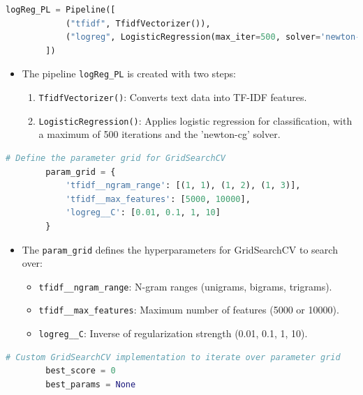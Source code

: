 \documentclass{solutionclass} %
\begin{document}
\begin{solution}
	\begin{lstlisting}[language=Python]
        logReg_PL = Pipeline([
            ("tfidf", TfidfVectorizer()),
            ("logreg", LogisticRegression(max_iter=500, solver='newton-cg'))
        ])
        \end{lstlisting}
        
        \begin{itemize}
            \item The pipeline \texttt{logReg\_PL} is created with two steps:
            \begin{enumerate}
                \item \texttt{TfidfVectorizer()}: Converts text data into TF-IDF features.
                \item \texttt{LogisticRegression()}: Applies logistic regression for classification, with a maximum of 500 iterations and the 'newton-cg' solver.
            \end{enumerate}
        \end{itemize}
        
        \begin{lstlisting}[language=Python]
        # Define the parameter grid for GridSearchCV
        param_grid = {
            'tfidf__ngram_range': [(1, 1), (1, 2), (1, 3)],
            'tfidf__max_features': [5000, 10000],
            'logreg__C': [0.01, 0.1, 1, 10]
        }
        \end{lstlisting}
        
        \begin{itemize}
            \item The \texttt{param\_grid} defines the hyperparameters for GridSearchCV to search over:
            \begin{itemize}
                \item \texttt{tfidf\_\_ngram\_range}: N-gram ranges (unigrams, bigrams, trigrams).
                \item \texttt{tfidf\_\_max\_features}: Maximum number of features (5000 or 10000).
                \item \texttt{logreg\_\_C}: Inverse of regularization strength (0.01, 0.1, 1, 10).
            \end{itemize}
        \end{itemize}
        
        \begin{lstlisting}[language=Python]
        # Custom GridSearchCV implementation to iterate over parameter grid
        best_score = 0
        best_params = None
        

\end{lstlisting}
\end{solution}
\end{document}
